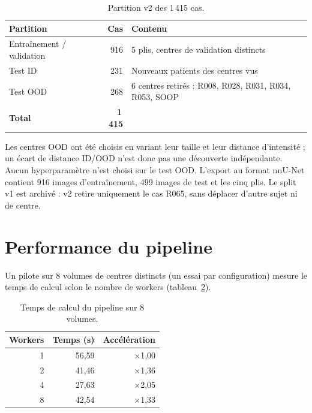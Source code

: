 \documentclass[11pt,a4paper]{report}
\begin{document}
\begin{table}[H]
  \centering
  \caption{Partition v2 des 1\,415 cas.}
  \label{tab:splits}
  \begin{tabularx}{\textwidth}{lrX}
    \toprule
    \textbf{Partition} & \textbf{Cas} & \textbf{Contenu} \\
    \midrule
    Entraînement / validation & 916 & 5 plis, centres de validation distincts \\
    Test ID                   & 231 & Nouveaux patients des centres vus \\
    Test OOD                  & 268 & 6 centres retirés : R008, R028, R031, R034, R053, SOOP \\
    \midrule
    \textbf{Total}            & \textbf{1\,415} & \\
    \bottomrule
  \end{tabularx}
\end{table}

Les centres OOD ont été choisis en variant leur taille et leur distance
d'intensité ; un écart de distance ID/OOD n'est donc pas une découverte
indépendante. Aucun hyperparamètre n'est choisi sur le test OOD. L'export au
format nnU-Net contient 916 images d'entraînement, 499 images de test et les
cinq plis. Le split v1 est archivé : v2 retire uniquement le cas R065, sans
déplacer d'autre sujet ni de centre.

\section{Performance du pipeline}

Un pilote sur 8 volumes de centres distincts (un essai par configuration)
mesure le temps de calcul selon le nombre de workers
(tableau~\ref{tab:bench}).

\begin{table}[H]
  \centering
  \caption{Temps de calcul du pipeline sur 8 volumes.}
  \label{tab:bench}
  \begin{tabular}{rrr}
    \toprule
    \textbf{Workers} & \textbf{Temps (s)} & \textbf{Accélération} \\
    \midrule
    1 & 56,59 & $\times$1,00 \\
    2 & 41,46 & $\times$1,36 \\
    4 & 27,63 & $\times$2,05 \\
    8 & 42,54 & $\times$1,33 \\
    \bottomrule
  \end{tabular}
\end{table}
\end{document}
